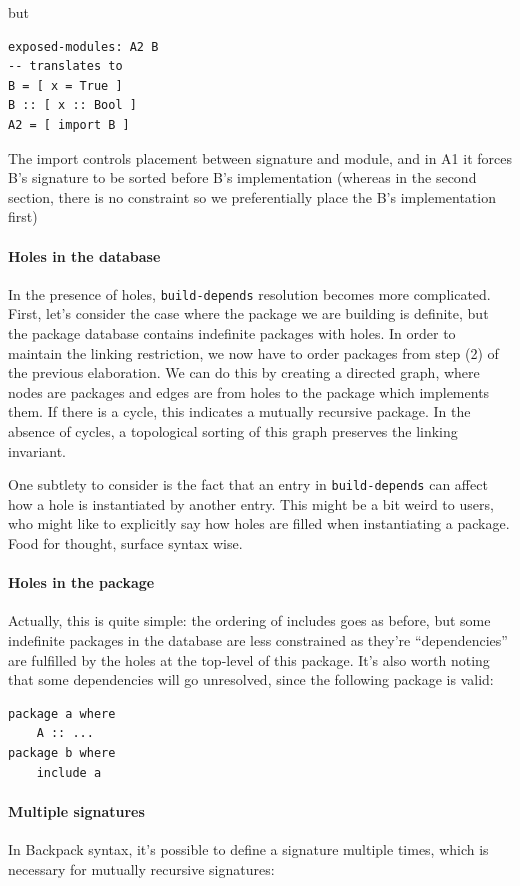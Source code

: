 \documentclass{article}
\begin{document}
but

\begin{verbatim}
exposed-modules: A2 B
-- translates to
B = [ x = True ]
B :: [ x :: Bool ]
A2 = [ import B ]
\end{verbatim}

The import controls placement between signature and module, and in A1 it
forces B's signature to be sorted before B's implementation (whereas in
the second section, there is no constraint so we preferentially place
the B's implementation first)

\paragraph{Holes in the database} In the presence of holes,
\verb|build-depends| resolution becomes more complicated.  First,
let's consider the case where the package we are building is
definite, but the package database contains indefinite packages with holes.
In order to maintain the linking restriction, we now have to order packages
from step (2) of the previous elaboration.  We can do this by creating
a directed graph, where nodes are packages and edges are from holes to the
package which implements them.  If there is a cycle, this indicates a mutually
recursive package.  In the absence of cycles, a topological sorting of this
graph preserves the linking invariant.

One subtlety to consider is the fact that an entry in \verb|build-depends|
can affect how a hole is instantiated by another entry.  This might be a
bit weird to users, who might like to explicitly say how holes are
filled when instantiating a package.  Food for thought, surface syntax wise.

\paragraph{Holes in the package} Actually, this is quite simple: the
ordering of includes goes as before, but some indefinite packages in the
database are less constrained as they're ``dependencies'' are fulfilled
by the holes at the top-level of this package.  It's also worth noting
that some dependencies will go unresolved, since the following package
is valid:

\begin{verbatim}
package a where
    A :: ...
package b where
    include a
\end{verbatim}

\paragraph{Multiple signatures}  In Backpack syntax, it's possible to
define a signature multiple times, which is necessary for mutually
recursive signatures:
\end{document}
